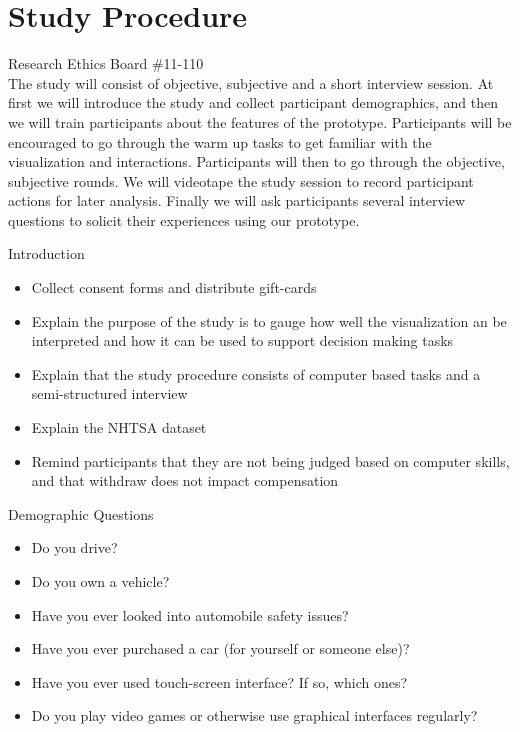 \appendix


\chapter{Study Procedure}

\noindent 
Research Ethics Board \#11-110 \\
\noindent
The study will consist of objective, subjective and a short interview session.
At first we will introduce the study and collect participant demographics, and
then we will train participants about the features of the prototype.
Participants will be encouraged to go through the warm up tasks to get familiar
with the visualization and interactions. Participants will then to go through
the objective, subjective rounds. We will videotape the study session to record
participant actions for later analysis. Finally we will ask participants several
interview questions to solicit their experiences using our prototype.

\noindent
Introduction
\begin{itemize}[noitemsep]
  \item Collect consent forms and distribute gift-cards
  \item Explain the purpose of the study is to gauge how well the visualization
  an be interpreted and how it can be used to support decision making tasks
  \item Explain that the study procedure consists of computer based tasks and a
  semi-structured interview
  \item Explain the NHTSA dataset
  \item Remind participants that they are not being judged based on computer
  skills, and that withdraw does not impact compensation
\end{itemize}

\noindent 
Demographic Questions
\begin{itemize}[noitemsep]
  \item Do you drive?
  \item Do you own a vehicle?
  \item Have you ever looked into automobile safety issues?
  \item Have you ever purchased a car (for yourself or someone else)?
  \item Have you ever used touch-screen interface? If so, which ones?
  \item Do you play \threed video games or otherwise use \threed graphical
  interfaces regularly?
\end{itemize}


